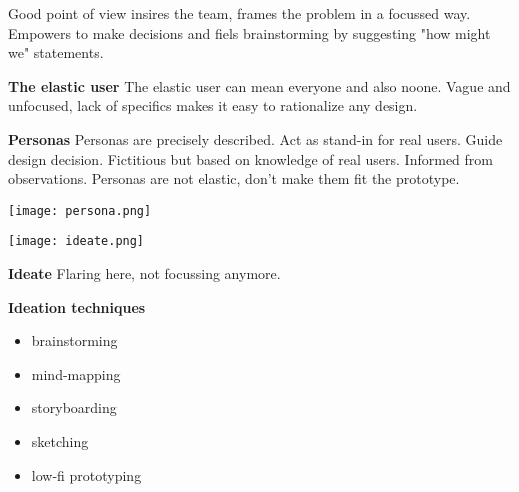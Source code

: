 Good point of view insires the team, frames the problem in a focussed way. Empowers to make decisions and fiels brainstorming by suggesting "how might we" statements. \medskip

\textbf{The elastic user}
The elastic user can mean everyone and also noone. Vague and unfocused, lack of specifics makes it easy to rationalize any design. \medskip

\textbf{Personas}
Personas are precisely described. Act as stand-in for real users. Guide design decision. Fictitious but based on knowledge of real users. Informed from observations.
Personas are not elastic, don't make them fit the prototype. 

\begin{center}
	\texttt{[image: persona.png]}
\end{center}

\begin{center}
	\texttt{[image: ideate.png]}
\end{center}

\textbf{Ideate}
Flaring here, not focussing anymore. \medskip

\textbf{Ideation techniques}

\begin{multicols}{2}
    \begin{itemize}[itemsep=-5pt, topsep=-20pt, leftmargin=*]
	\item brainstorming
	\item mind-mapping
	\item storyboarding
	\item sketching
	\item low-fi prototyping
	\end{itemize}
\end{multicols}


